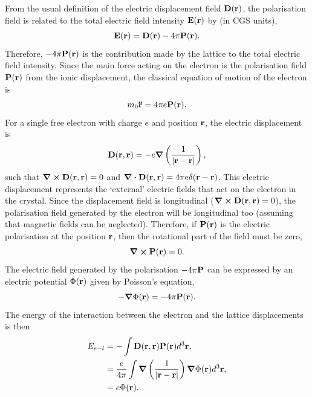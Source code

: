 From the usual definition of the electric displacement field $\vb{D}(\vb{r})$, the polarisation field is related to the total electric field intensity $\vb{E}(\vb{r})$ by (in CGS units),
\begin{equation}
    \vb{E}(\vb{r}) = \vb{D}(\vb{r}) - 4\pi\vb{P}(\vb{r}).
\label{eqn-2121-1}
\end{equation}
Therefore, $-4\pi\vb{P}(\vb{r})$ is the contribution made by the lattice to the total electric field intensity. Since the main force acting on the electron is the polarisation field $\vb{P}(\vb{r})$ from the ionic displacement, the classical equation of motion of the electron is
\begin{equation}
    m_0 \vb{\ddot{r}} = 4\pi e \vb{P}(\vb{r}).
\label{eqn-2121-2}
\end{equation}
For a single free electron with charge $e$ and position $\vb{r}$, the electric displacement is
\begin{equation}
    \vb{D}(\vb{r}, \vb{r}) = -e \grad \left(\frac{1}{\abs{\vb{r} - \vb{r}}}\right),
\label{eqn-2121-3}
\end{equation}
such that $\curl \vb{D}(\vb{r}, \vb{r}) = 0$ and $\div \vb{D}(\vb{r}, \vb{r}) = 4\pi e \delta (\vb{r} - \vb{r})$. This electric displacement represents the `external' electric fields that act on the electron in the crystal. Since the displacement field is longitudinal ($\curl \vb{D}(\vb{r}, \vb{r}) = 0$), the polarisation field generated by the electron will be longitudinal too (assuming that magnetic fields can be neglected). Therefore, if $\vb{P}(\vb{r})$ is the electric polarisation at the position $\vb{r}$, then the rotational part of the field must be zero,
\begin{equation}
    \curl \vb{P}(\vb{r}) = 0.
\label{eqn-2121-4}
\end{equation}
The electric field generated by the polarisation $-4\pi \vb{P}$ can be expressed by an electric potential $\Phi(\vb{r})$ given by Poisson's equation,
\begin{equation}
    -\grad \Phi(\vb{r}) = -4\pi\vb{P}(\vb{r}).
\label{eqn-2121-5}
\end{equation}
The energy of the interaction between the electron and the lattice displacements is then
\begin{equation}
    \begin{aligned}
    E_{e-l} &= -\int \vb{D}(\vb{r}, \vb{r}) \vb{P}(\vb{r}) d^3 \vb{r}, \\ 
    &= \frac{e}{4\pi} \int \grad \left( \frac{1}{\abs{\vb{r} - \vb{r}}} \right) \grad \Phi(\vb{r}) d^3 \vb{r}, \\
    &= e\Phi(\vb{r}).
    \end{aligned}
\label{eqn-2121-6}
\end{equation}

